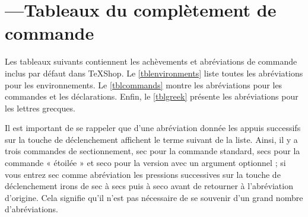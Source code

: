 \documentclass[11pt,french]{article}
\newcommand{\TS}{\textsf{\TeX Shop}}
\newcommand{\cmd}[1]{\textsf{#1}}
\begin{document}
\section{---\quad Tableaux du complètement de commande}\label{secCCTables}
%
%

Les tableaux suivants contiennent les achèvements et abréviations de commande inclus par défaut dans \TS. Le \cref{tblenvironments}  liste toutes les abréviations pour les environnements. Le \cref{tblcommands}  montre les abréviations pour les commandes et les déclarations. Enfin, le \cref{tblgreek}  présente les abréviations pour les lettres grecques.

Il est important de se rappeler que d'une abréviation donnée les appuis successifs sur la touche de déclenchement affichent le terme suivant de la liste. Ainsi, il y a trois commandes de sectionnement, \cmd{sec} pour la commande standard, \cmd{secs} pour la commande « étoilée » et \cmd{seco} pour la version avec un argument optionnel ; si vous entrez \cmd{sec} comme abréviation les pressions successives sur la touche de déclenchement irons de \cmd{sec} à \cmd{secs} puis à \cmd{seco} avant de retourner à l'abréviation d'origine. Cela signifie qu'il n'est pas nécessaire de se souvenir d'un grand nombre  d'abréviations.
\end{document}
